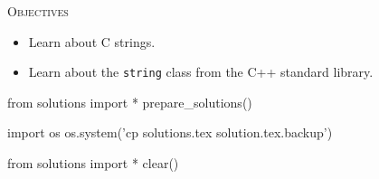 
\textsc{Objectives}

\begin{itemize}
\item
  Learn about C strings.
\item
  Learn about the \texttt{string} class from the C++ standard library.
\end{itemize}









\begin{python0}
from solutions import *
prepare_solutions()
\end{python0}
\begin{python}
import os
os.system('cp solutions.tex solution.tex.backup')  
\end{python}

\begin{python0}
from solutions import *
clear()
\end{python0}
